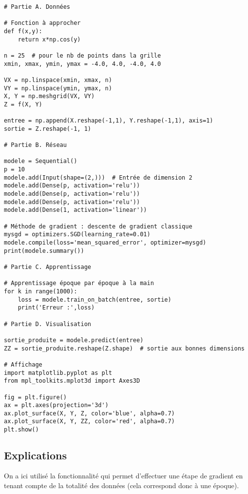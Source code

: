 \documentclass[11pt,class=report,crop=false]{standalone}
\begin{document}
\begin{lstlisting}
# Partie A. Données

# Fonction à approcher
def f(x,y):
    return x*np.cos(y)

n = 25  # pour le nb de points dans la grille
xmin, xmax, ymin, ymax = -4.0, 4.0, -4.0, 4.0

VX = np.linspace(xmin, xmax, n)
VY = np.linspace(ymin, ymax, n)
X, Y = np.meshgrid(VX, VY)
Z = f(X, Y)

entree = np.append(X.reshape(-1,1), Y.reshape(-1,1), axis=1)
sortie = Z.reshape(-1, 1)

# Partie B. Réseau 

modele = Sequential()
p = 10
modele.add(Input(shape=(2,)))  # Entrée de dimension 2
modele.add(Dense(p, activation='relu'))
modele.add(Dense(p, activation='relu'))
modele.add(Dense(p, activation='relu'))
modele.add(Dense(1, activation='linear'))

# Méthode de gradient : descente de gradient classique
mysgd = optimizers.SGD(learning_rate=0.01)
modele.compile(loss='mean_squared_error', optimizer=mysgd)
print(modele.summary())

# Partie C. Apprentissage

# Apprentissage époque par époque à la main
for k in range(1000):
    loss = modele.train_on_batch(entree, sortie)
    print('Erreur :',loss)

# Partie D. Visualisation

sortie_produite = modele.predict(entree)
ZZ = sortie_produite.reshape(Z.shape)  # sortie aux bonnes dimensions

# Affichage
import matplotlib.pyplot as plt
from mpl_toolkits.mplot3d import Axes3D

fig = plt.figure()
ax = plt.axes(projection='3d')
ax.plot_surface(X, Y, Z, color='blue', alpha=0.7)
ax.plot_surface(X, Y, ZZ, color='red', alpha=0.7)
plt.show()
\end{lstlisting}

\subsection{Explications}

On a ici utilisé la fonctionnalité  qui permet d'effectuer une étape de gradient en tenant compte de la totalité des données (cela correspond donc à une époque).


\end{document}
